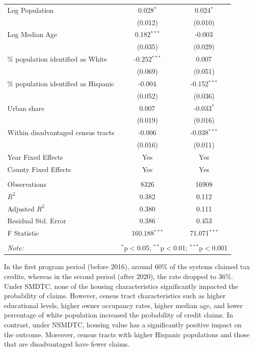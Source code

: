 \documentclass[11pt,twoside,letterpaper]{article}
\begin{document}
\begin{table}[!ht]
{\begin{tabular}{@{\extracolsep{5pt}}lcc}
 Log Population & 0.028$^{*}$ & 0.024$^{*}$ \\
& (0.012) & (0.010) \\
 Log Median Age & 0.182$^{***}$ & -0.003$^{}$ \\
& (0.035) & (0.029) \\
 \% population identified as White & -0.252$^{***}$ & 0.007$^{}$ \\
& (0.069) & (0.051) \\
 \% population identified as Hispanic & -0.004$^{}$ & -0.152$^{***}$ \\
& (0.052) & (0.036) \\
 Urban share & 0.007$^{}$ & -0.033$^{*}$ \\
& (0.019) & (0.016) \\
 Within disadvantaged census tracts & -0.006$^{}$ & -0.038$^{***}$ \\
& (0.016) & (0.011) \\
 Year Fixed Effects & Yes & Yes \\
 County Fixed Effects & Yes & Yes \\
\hline \\[-1.8ex]
 Observations & 8326 & 16908 \\
 $R^2$ & 0.382 & 0.112 \\
 Adjusted $R^2$ & 0.380 & 0.111 \\
 Residual Std. Error & 0.386 & 0.453 \\
 F Statistic & 160.188$^{***}$ & 71.071$^{***}$ \\
\hline
\hline \\[-1.8ex]
\textit{Note:} & \multicolumn{2}{r}{$^{*}$p$<$0.05; $^{**}$p$<$0.01; $^{***}$p$<$0.001} \\
\end{tabular}}
\end{table}

In the first program period (before 2016), around 60\% of the systems claimed tax credits, whereas in the second period (after 2020), the rate dropped to 36\%. Under SMDTC, none of the housing characteristics significantly impacted the probability of claims. However, census tract characteristics such as higher educational levels, higher owner occupancy rates, higher median age, and lower percentage of white population increased the probability of credit claims. In contrast, under NSMDTC, housing value has a significantly positive impact on the outcome. Moreover, census tracts with higher Hispanic populations and those that are disadvantaged have fewer claims.
\end{document}
